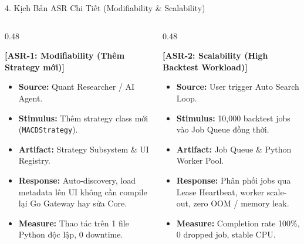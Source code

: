 \documentclass[aspectratio=169,10pt]{beamer}
\begin{document}
\begin{frame}{4. Kịch Bản ASR Chi Tiết (Modifiability \& Scalability)}
\begin{columns}[T]
\begin{column}{0.48\textwidth}
\begin{block}{\textbf{[ASR-1: Modifiability (Thêm Strategy mới)]}}
\begin{itemize}
  \item \textbf{Source:} Quant Researcher / AI Agent.
  \item \textbf{Stimulus:} Thêm strategy class mới (\texttt{MACDStrategy}).
  \item \textbf{Artifact:} Strategy Subsystem \& UI Registry.
  \item \textbf{Response:} Auto-discovery, load metadata lên UI không cần compile lại Go Gateway hay sửa Core.
  \item \textbf{Measure:} Thao tác trên 1 file Python độc lập, 0 downtime.
\end{itemize}
\end{block}
\end{column}
\begin{column}{0.48\textwidth}
\begin{block}{\textbf{[ASR-2: Scalability (High Backtest Workload)]}}
\begin{itemize}
  \item \textbf{Source:} User trigger Auto Search Loop.
  \item \textbf{Stimulus:} 10,000 backtest jobs vào Job Queue đồng thời.
  \item \textbf{Artifact:} Job Queue \& Python Worker Pool.
  \item \textbf{Response:} Phân phối jobs qua Lease Heartbeat, worker scale-out, zero OOM / memory leak.
  \item \textbf{Measure:} Completion rate 100\%, 0 dropped job, stable CPU.
\end{itemize}
\end{block}
\end{column}
\end{columns}
\end{frame}
\end{document}

